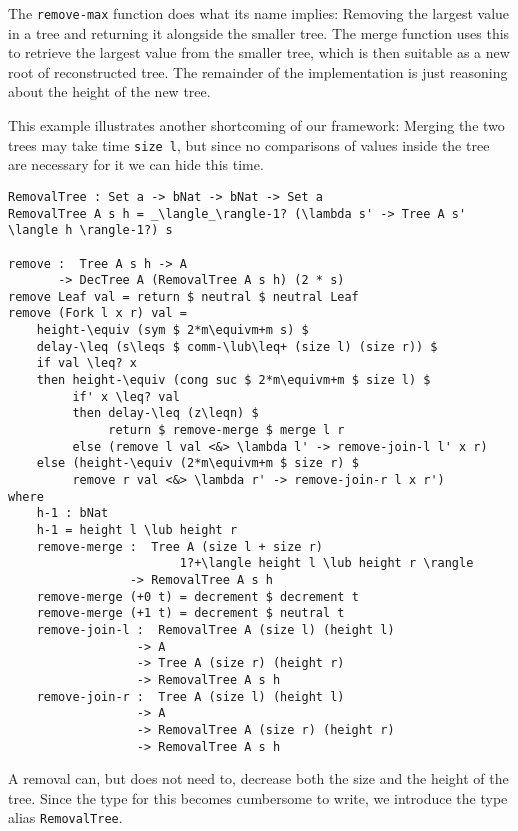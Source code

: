 The \texttt{remove-max} function does what its name implies: Removing the largest value in a tree and returning it alongside the smaller tree. The merge function uses this to retrieve the largest value from the smaller tree, which is then suitable as a new root of reconstructed tree. The remainder of the implementation is just reasoning about the height of the new tree.

This example illustrates another shortcoming of our framework: Merging the two trees may take time \texttt{size l}, but since no comparisons of values inside the tree are necessary for it we can hide this time.

\begin{lstlisting}[caption={Tree Removal},label={lst:tree:removal},emph={Tree,Fork,Leaf,RemovalTree,return,if,then,else,neutral,decrement,remove}]
RemovalTree : Set a -> bNat -> bNat -> Set a
RemovalTree A s h = _\langle_\rangle-1? (\lambda s' -> Tree A s' \langle h \rangle-1?) s

remove :  Tree A s h -> A
       -> DecTree A (RemovalTree A s h) (2 * s)
remove Leaf val = return $ neutral $ neutral Leaf
remove (Fork l x r) val =
    height-\equiv (sym $ 2*m\equivm+m s) $
    delay-\leq (s\leqs $ comm-\lub\leq+ (size l) (size r)) $
    if val \leq? x
    then height-\equiv (cong suc $ 2*m\equivm+m $ size l) $
         if' x \leq? val
         then delay-\leq (z\leqn) $
              return $ remove-merge $ merge l r
         else (remove l val <&> \lambda l' -> remove-join-l l' x r)
    else (height-\equiv (2*m\equivm+m $ size r) $
         remove r val <&> \lambda r' -> remove-join-r l x r')
where
    h-1 : bNat
    h-1 = height l \lub height r
    remove-merge :  Tree A (size l + size r)
                        1?+\langle height l \lub height r \rangle
                 -> RemovalTree A s h
    remove-merge (+0 t) = decrement $ decrement t
    remove-merge (+1 t) = decrement $ neutral t
    remove-join-l :  RemovalTree A (size l) (height l)
                  -> A
                  -> Tree A (size r) (height r)
                  -> RemovalTree A s h
    remove-join-r :  Tree A (size l) (height l)
                  -> A
                  -> RemovalTree A (size r) (height r)
                  -> RemovalTree A s h
\end{lstlisting}

A removal can, but does not need to, decrease both the size and the height of the tree. Since the type for this becomes cumbersome to write, we introduce the type alias \texttt{RemovalTree}.

